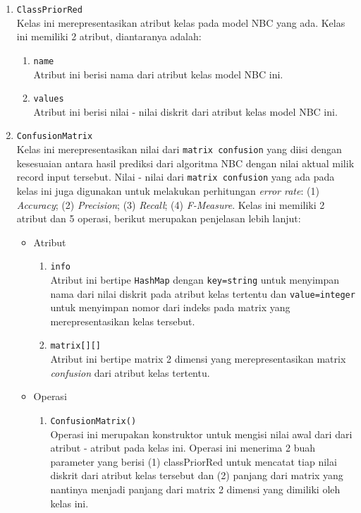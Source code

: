 \begin{enumerate}
\begin{enumerate}
		\item \texttt{ClassPriorRed}\\
		Kelas ini merepresentasikan atribut kelas pada model NBC yang ada. Kelas ini memiliki 2 atribut, diantaranya adalah:
		\begin{enumerate}
			\item \texttt{name}\\
			Atribut ini berisi nama dari atribut kelas model NBC ini.
			
			\item \texttt{values}\\
			Atribut ini berisi nilai - nilai diskrit dari atribut kelas model NBC ini.
		\end{enumerate}
		
		\item \texttt{ConfusionMatrix}\\		
		Kelas ini merepresentasikan nilai dari \texttt{matrix confusion} yang diisi dengan kesesuaian antara hasil prediksi dari algoritma NBC dengan nilai aktual milik record input tersebut. Nilai - nilai dari \texttt{matrix confusion} yang ada pada kelas ini juga digunakan untuk melakukan perhitungan \textit{error rate}: (1) \textit{Accuracy}; (2) \textit{Precision}; (3) \textit{Recall}; (4) \textit{F-Measure}. Kelas ini memiliki 2 atribut dan 5 operasi, berikut merupakan penjelasan lebih lanjut:
		\begin{itemize}
			\item Atribut
			\begin{enumerate}
				\item \texttt{info}\\
				Atribut ini bertipe \texttt{HashMap} dengan \texttt{key=string} untuk menyimpan nama dari nilai diskrit pada atribut kelas tertentu dan \texttt{value=integer} untuk menyimpan nomor dari indeks pada matrix yang merepresentasikan kelas tersebut.
			
				\item \texttt{matrix[][]}\\
				Atribut ini bertipe matrix 2 dimensi yang merepresentasikan matrix \textit{confusion} dari atribut kelas tertentu.
			
			\end{enumerate}
			
			\item Operasi
			\begin{enumerate}
				\item \texttt{ConfusionMatrix()}\\
				Operasi ini merupakan konstruktor untuk mengisi nilai awal dari dari atribut - atribut pada kelas ini. Operasi ini menerima 2 buah parameter yang berisi (1) classPriorRed untuk mencatat tiap nilai diskrit dari atribut kelas tersebut dan (2) panjang dari matrix yang nantinya menjadi panjang dari matrix 2 dimensi yang dimiliki oleh kelas ini.
				

\end{enumerate}
\end{itemize}
\end{enumerate}
\end{enumerate}
